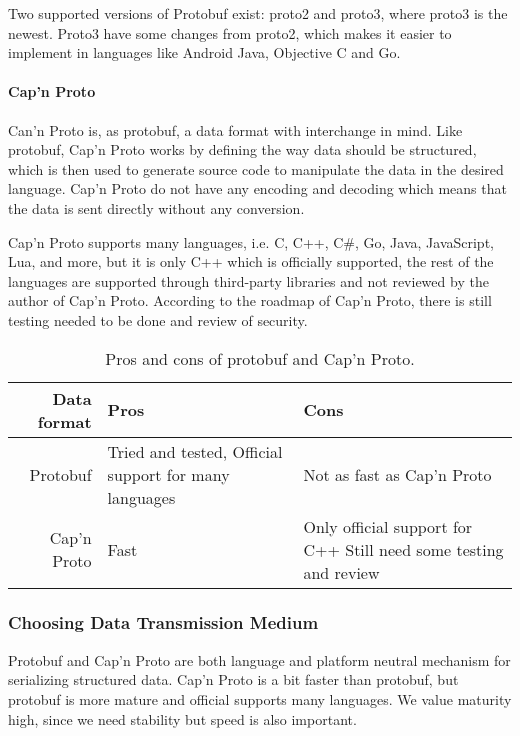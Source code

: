Two supported versions of Protobuf exist: proto2 and proto3, where proto3 is the newest.
Proto3 have some changes from proto2, which makes it easier to implement in languages like Android Java, Objective C and Go.\cite{proto3}

\paragraph{Cap'n Proto}
Can'n Proto is, as protobuf, a data format with interchange in mind.
Like protobuf, Cap'n Proto works by defining the way data should be structured, which is then used to generate source code to manipulate the data in the desired language\cite{capnproto_schema}.
Cap'n Proto do not have any encoding and decoding which means that the data is sent directly without any conversion\cite{capnproto}.

Cap'n Proto supports many languages, i.e. C, C++, C\#, Go, Java, JavaScript, Lua, and more,
but it is only C++ which is officially supported, 
the rest of the languages are supported through third-party libraries and not reviewed by the author of Cap'n Proto\cite{capnproto_langs}. 
According to the roadmap of Cap'n Proto, there is still testing needed to be done and review of security\cite{capnproto_roadmap}.

\begin{table}
    \setlength{\tabcolsep}{10pt}
    \centering
    \begin{tabularx}{0.9\textwidth}{rXX}\toprule
        Data format & Pros                              & Cons \\\midrule
        Protobuf    & Tried and tested, \newline Official support for many languages & Not as fast as Cap'n Proto \\
        Cap'n Proto & Fast                              & Only official support for C++ \newline Still need some testing and review \\
    \end{tabularx}
    \caption{Pros and cons of protobuf and Cap'n Proto.}\label{tab:format_pros_cons}
\end{table}

\subsubsection{Choosing Data Transmission Medium}
Protobuf and Cap'n Proto are both language and platform neutral mechanism for serializing structured data.
Cap'n Proto is a bit faster than protobuf, but protobuf is more mature and official supports many languages. 
We value maturity high, since we need stability but speed is also important.

